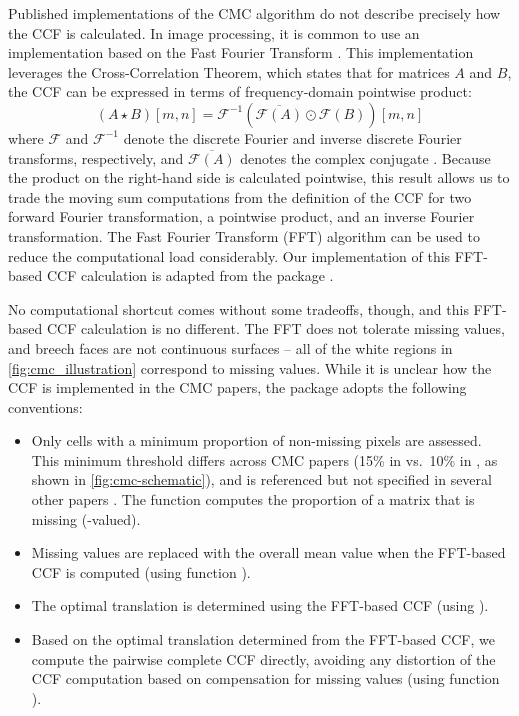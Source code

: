 Published implementations of the CMC algorithm do not describe precisely
how the CCF is calculated. In image processing, it is common to use an
implementation based on the Fast Fourier Transform
\citep{Brown92asurvey}. This implementation leverages the
Cross-Correlation Theorem, which states that for matrices \(A\) and
\(B\), the CCF can be expressed in terms of frequency-domain pointwise
product: \[
(A \star B )[m,n]= \mathcal{F}^{-1}\left(\overline{\mathcal{F}(A)} \odot \mathcal{F}(B)\right)[m,n]
\] where \(\mathcal{F}\) and \(\mathcal{F}^{-1}\) denote the discrete
Fourier and inverse discrete Fourier transforms, respectively, and
\(\overline{\mathcal{F}(A)}\) denotes the complex conjugate
\citep{fft_brigham}. Because the product on the right-hand side is
calculated pointwise, this result allows us to trade the moving sum
computations from the definition of the CCF for two forward Fourier
transformation, a pointwise product, and an inverse Fourier
transformation. The Fast Fourier Transform (FFT) algorithm can be used
to reduce the computational load considerably. Our implementation of
this FFT-based CCF calculation is adapted from the 
package \citep{cartridges3D}.

No computational shortcut comes without some tradeoffs, though, and this
FFT-based CCF calculation is no different. The FFT does not tolerate
missing values, and breech faces are not continuous surfaces -- all of
the white regions in \autoref{fig:cmc_illustration} correspond to
missing values. While it is unclear how the CCF is implemented in the
CMC papers, the  package adopts the following conventions:

\begin{itemize}
\item
  Only cells with a minimum proportion of non-missing pixels are
  assessed. This minimum threshold differs across CMC papers (15\% in
  \citet{chen_convergence_2017} vs.~10\% in
  \citet{song_estimating_2018}, as shown in
  \autoref{fig:cmc-schematic}), and is referenced but not specified in
  several other papers
  \citep{tong_fired_2014,song_3d_2014,chu_validation_2013}. The
   function computes the proportion of
  a matrix that is missing (-valued).
\item
  Missing values are replaced with the overall mean value when the
  FFT-based CCF is computed (using function
  ).
\item
  The optimal translation is determined using the FFT-based CCF (using
  ).
\item
  Based on the optimal translation determined from the FFT-based CCF, we
  compute the pairwise complete CCF directly, avoiding any distortion of
  the CCF computation based on compensation for missing values (using
  function ).
\end{itemize}

